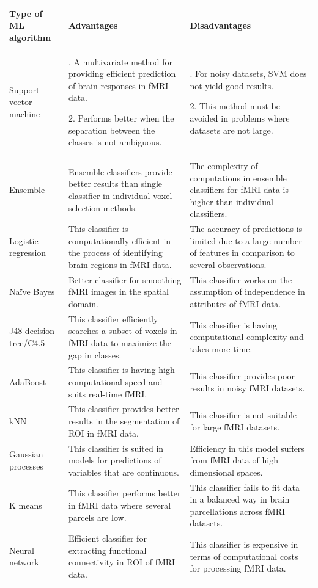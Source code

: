 \documentclass{article}
\begin{document}
\begin{center}
\begin{tabularx}{0.8\textwidth} { 
  | >{\raggedright\arraybackslash}X 
  | >{\centering\arraybackslash}X 
  | >{\raggedleft\arraybackslash}X | }
 \hline
 Type of ML
algorithm & Advantages & Disadvantages\\
 \hline
 Support vector
machine  & 1. A multivariate method for
providing efficient prediction
of brain responses in fMRI
data.

2. Performs better when the
separation between the
classes is not ambiguous.  & 
1. For noisy datasets, SVM does
not yield good results.

2. This method must be avoided in
problems where datasets are not
large.\\
\hline
 Ensemble & Ensemble classifiers provide
better results than single
classifier in individual voxel
selection methods. & The complexity of computations in
ensemble classifiers for fMRI
data is higher than individual
classifiers.\\
 \hline
 Logistic
regression  & This classifier is computationally
efficient in the process of
identifying brain regions in
fMRI data.  & The accuracy of predictions is
limited due to a large number of
features in comparison to several
observations.\\
\hline
 Naïve Bayes  & Better classifier for smoothing
fMRI images in the spatial
domain.  & This classifier works on the
assumption of independence in
attributes of fMRI data.\\
\hline
 J48 decision
tree/C4.5  & This classifier efficiently
searches a subset of voxels in
fMRI data to maximize the
gap in classes.  & This classifier is having
computational complexity and
takes more time.\\
\hline
 AdaBoost & This classifier is having high
computational speed and
suits real-time fMRI.  & This classifier provides poor results
in noisy fMRI datasets.\\
\hline
 kNN  & This classifier provides better
results in the segmentation of
ROI in fMRI data.  & This classifier is not suitable for
large fMRI datasets.\\
\hline
 Gaussian
processes  & This classifier is suited in models
for predictions of variables
that are continuous.  & Efficiency in this model suffers
from fMRI data of high
dimensional spaces.\\
 \hline
 K means  & This classifier performs better in
fMRI data where several
parcels are low.  & This classifier fails to fit data in a
balanced way in brain
parcellations across fMRI
datasets.\\
 \hline
 Neural network  & Efficient classifier for extracting
functional connectivity in ROI
of fMRI data.  & This classifier is expensive in terms
of computational costs for
processing fMRI data.\\
\hline

\end{tabularx}
\end{center}
\end{document}
